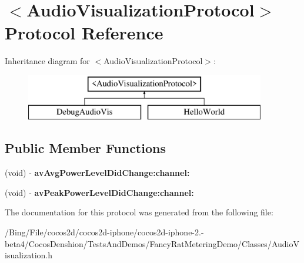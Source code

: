 \hypertarget{protocol_audio_visualization_protocol-p}{\section{$<$Audio\-Visualization\-Protocol$>$ Protocol Reference}
\label{protocol_audio_visualization_protocol-p}
}
Inheritance diagram for $<$Audio\-Visualization\-Protocol$>$\-:\begin{figure}[H]
\begin{center}
\leavevmode
\includegraphics[height=2.000000cm]{protocol_audio_visualization_protocol-p}
\end{center}
\end{figure}
\subsection*{Public Member Functions}
\begin{DoxyCompactItemize}
\item 
\hypertarget{protocol_audio_visualization_protocol-p_a16ced94ac20dcf1d5adfaa5b32538e4f}{(void) -\/ {\bfseries av\-Avg\-Power\-Level\-Did\-Change\-:channel\-:}}\label{protocol_audio_visualization_protocol-p_a16ced94ac20dcf1d5adfaa5b32538e4f}

\item 
\hypertarget{protocol_audio_visualization_protocol-p_a59f027ae747aaa64fe16327524a09be2}{(void) -\/ {\bfseries av\-Peak\-Power\-Level\-Did\-Change\-:channel\-:}}\label{protocol_audio_visualization_protocol-p_a59f027ae747aaa64fe16327524a09be2}

\end{DoxyCompactItemize}


The documentation for this protocol was generated from the following file\-:\begin{DoxyCompactItemize}
\item 
/\-Bing/\-File/cocos2d/cocos2d-\/iphone/cocos2d-\/iphone-\/2.-\/beta4/\-Cocos\-Denshion/\-Tests\-And\-Demos/\-Fancy\-Rat\-Metering\-Demo/\-Classes/Audio\-Visualization.\-h\end{DoxyCompactItemize}
